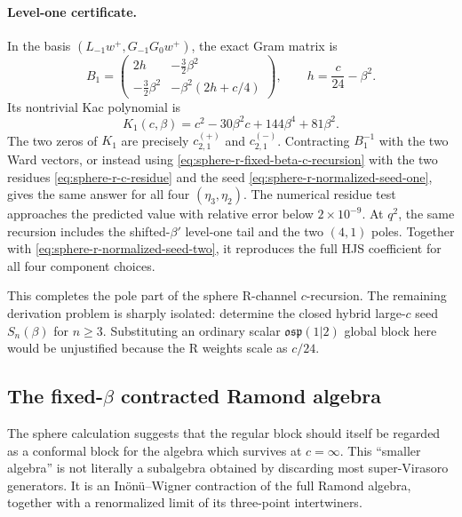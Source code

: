 \documentclass[11pt]{article}
\begin{document}
\paragraph{Level-one certificate.}
In the basis
\((L_{-1}w^+,G_{-1}G_0w^+)\), the exact Gram matrix is
\begin{equation}
 B_1=
 \begin{pmatrix}
 2h&-\frac32\beta^2\\
 -\frac32\beta^2&-\beta^2(2h+c/4)
 \end{pmatrix},
 \qquad h=\frac c{24}-\beta^2.
 \label{eq:sphere-r-level-one-gram}
\end{equation}
Its nontrivial Kac polynomial is
\begin{equation}
 K_1(c,\beta)
 =
 c^2-30\beta^2c+144\beta^4+81\beta^2.
 \label{eq:sphere-r-level-one-kac}
\end{equation}
The two zeros of \(K_1\) are precisely
\(c_{2,1}^{(+)}\) and \(c_{2,1}^{(-)}\).
Contracting \(B_1^{-1}\) with the two Ward vectors, or instead using
\eqref{eq:sphere-r-fixed-beta-c-recursion} with the two residues
\eqref{eq:sphere-r-c-residue} and the seed
\eqref{eq:sphere-r-normalized-seed-one}, gives the same answer for all four
\((\eta_3,\eta_2)\).  The numerical residue test approaches the predicted
value with relative error below \(2\times10^{-9}\).
At \(q^2\), the same recursion includes the shifted-\(\beta'\) level-one
tail and the two \((4,1)\) poles.  Together with
\eqref{eq:sphere-r-normalized-seed-two}, it reproduces the full HJS
coefficient for all four component choices.

This completes the pole part of the sphere R-channel \(c\)-recursion.  The
remaining derivation problem is sharply isolated: determine the closed
hybrid large-\(c\) seed \(S_n(\beta)\) for \(n\geq3\).  Substituting an
ordinary scalar \(\mathfrak{osp}(1|2)\) global block here would be
unjustified because the R weights scale as \(c/24\).

\subsection{\texorpdfstring{The fixed-\(\beta\) contracted Ramond algebra}
{The fixed-beta contracted Ramond algebra}}
\label{sec:contracted-r-algebra}

The sphere calculation suggests that the regular block should itself be
regarded as a conformal block for the algebra which survives at
\(c=\infty\).  This ``smaller algebra'' is not literally a subalgebra
obtained by discarding most super-Virasoro generators.  It is an
In\"on\"u--Wigner contraction of the full Ramond algebra, together with a
renormalized limit of its three-point intertwiners.
\end{document}
